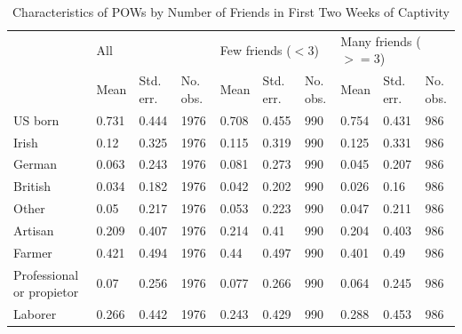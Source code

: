 \documentclass{article}
\begin{document}
\begin{table}
\caption{Characteristics of POWs by Number of Friends in First Two Weeks of Captivity}
\label{friends}
\begin{tabular}{llllllllll}

                                  & \multicolumn{3}{l}{All} & \multicolumn{3}{l}{Few friends ($<3$)} & \multicolumn{3}{l}{Many friends ($>=3$)} \\
                                  & Mean                    & Std. err.                            & No. obs.                               & Mean & Std. err. & No. obs. & Mean & Std. err. & No. obs. \\
US born                           & 0.731                   & 0.444                                & 1976                                   & 0.708 & 0.455 & 990 & 0.754 & 0.431 & 986 \\
Irish                             & 0.12                    & 0.325                                & 1976                                   & 0.115 & 0.319 & 990 & 0.125 & 0.331 & 986 \\
German                            & 0.063                   & 0.243                                & 1976                                   & 0.081 & 0.273 & 990 & 0.045 & 0.207 & 986 \\
British                           & 0.034                   & 0.182                                & 1976                                   & 0.042 & 0.202 & 990 & 0.026 & 0.16 & 986 \\
Other                             & 0.05                    & 0.217                                & 1976                                   & 0.053 & 0.223 & 990 & 0.047 & 0.211 & 986 \\
Artisan                           & 0.209                   & 0.407                                & 1976                                   & 0.214 & 0.41 & 990 & 0.204 & 0.403 & 986 \\
Farmer                            & 0.421                   & 0.494                                & 1976                                   & 0.44 & 0.497 & 990 & 0.401 & 0.49 & 986 \\
Professional or propietor         & 0.07                    & 0.256                                & 1976                                   & 0.077 & 0.266 & 990 & 0.064 & 0.245 & 986 \\
Laborer                           & 0.266                   & 0.442                                & 1976                                   & 0.243 & 0.429 & 990 & 0.288 & 0.453 & 986 \\

\end{tabular}
\end{table}
\end{document}

